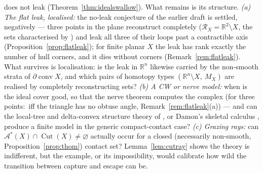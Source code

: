 \documentclass[11pt]{article}
\theoremstyle{remark}
\newcommand{\R}{\mathbb{R}}
\newcommand{\X}{X}
\newcommand{\Mx}{M_{\X}}
\newcommand{\Rx}{\mathcal{R}_{\X}}
\newcommand{\conv}{\operatorname{conv}}
\newcommand{\Cut}{\operatorname{Cut}}
\newcommand{\Aub}{\mathcal{A}^{\ast}}
\begin{document}
\begin{enumerate}[label=(\arabic*)]
does not leak (Theorem~\ref{thm:idealswallow}). What remains is its
structure. \emph{(a) The flat leak, localised:} the no-leak
conjecture of the earlier draft is settled, negatively --- three
points in the plane reconstruct completely
($\Rx=\R^{2}\setminus\X$, the sets characterised by
\cite[Thm.~6]{Bia}) and leak all three of their loops past a
contractible axis (Proposition~\ref{prop:flatleak}); for finite
planar $\X$ the leak has rank exactly the number of hull corners,
and it dies without corners
(Remark~\ref{rem:flatleak}). What survives is localisation: is the
leak in $\R^{n}$ likewise carried by the non-smooth strata of
$\partial\conv\X$, and which pairs of homotopy types
$(\R^{n}\setminus\X,\ \Mx)$ are realised by completely
reconstructing sets? \emph{(b) A CW or
nerve model:} when is the ideal cover good, so that the nerve
theorem \cite{Bor} computes the complex (for three points:\ iff the
triangle has no obtuse angle, Remark~\ref{rem:flatleak}(a)) --- and
can the local-tree
and delta-convex structure theory of \cite{TS,MT}, or Damon's
skeletal calculus \cite{Dam}, produce a finite model in the generic
compact-contact case? \emph{(c) Grazing rays:} can
$\Aub(\X)\cap\Cut(\X)\neq\varnothing$ actually occur for a closed
(necessarily non-smooth, Proposition~\ref{prop:thom}) contact set?
Lemma~\ref{lem:cutray} shows the theory is indifferent, but the
example, or its impossibility, would calibrate how wild the
transition between capture and escape can be.
\end{enumerate}
\end{document}
